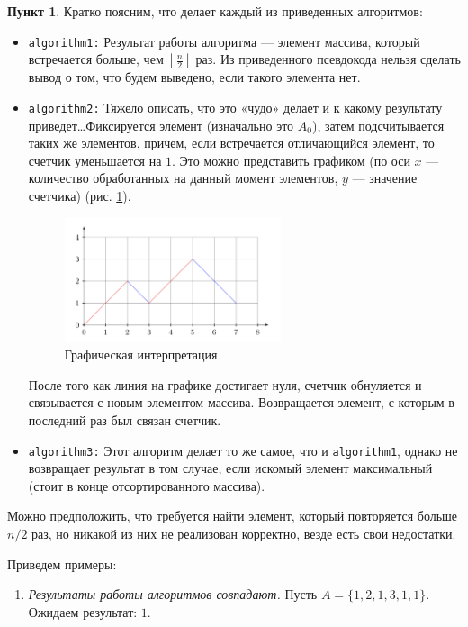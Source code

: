 \documentclass[11pt,a4paper]{scrarticle}
\theoremstyle{definition}
\newtheorem{subtask}{Пункт}
\begin{document}
\begin{subtask}
	Кратко поясним, что делает каждый из приведенных алгоритмов:
	\begin{itemize}
		\item \texttt{algorithm1:} Результат работы алгоритма --- элемент массива, который встречается больше, чем $\left\lfloor \frac{n}{2} \right\rfloor$ раз. Из приведенного псевдокода нельзя сделать вывод о том, что будем выведено, если такого элемента нет.
		\item \texttt{algorithm2:} Тяжело описать, что это «чудо» делает и к какому результату приведет\dots\linebreak Фиксируется элемент (изначально это $A_0$), затем подсчитывается таких же элементов, причем, если встречается отличающийся элемент, то счетчик уменьшается на $1$. Это можно представить графиком (по оси $x$ --- количество обработанных на данный момент элементов, $y$ --- значение счетчика) (рис. \ref{fig:graph}).
		      \begin{figure}[htp]
			      \centering
			      \includegraphics[width=0.6\textwidth]{pic.png}
			      \caption{Графическая интерпретация}
			      \label{fig:graph}
		      \end{figure}

		      После того как линия на графике достигает нуля, счетчик обнуляется и связывается с новым элементом массива. Возвращается элемент, с которым в последний раз был связан счетчик.
		\item \texttt{algorithm3:} Этот алгоритм делает то же самое, что и \texttt{algorithm1}, однако не возвращает результат в том случае, если искомый элемент максимальный (стоит в конце отсортированного массива).
	\end{itemize}

	Можно предположить, что требуется найти элемент, который повторяется больше $n/2$ раз, но никакой из них не реализован корректно, везде есть свои недостатки.

	Приведем примеры:
	\begin{enumerate}
		\item \emph{Результаты работы алгоритмов совпадают.} Пусть $A = \{1, 2, 1, 3, 1, 1\}$. Ожидаем результат: $1$.


\end{enumerate}
\end{subtask}
\end{document}
